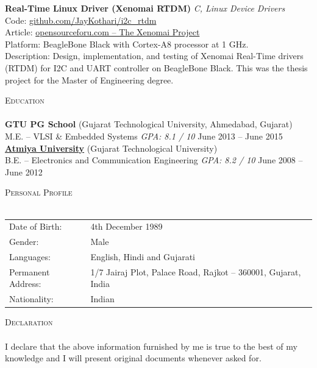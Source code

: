 \documentclass[a4paper]{article}
\newcommand{\lineunder} {
    \vspace*{-8pt} \\
    \hspace*{-18pt} \hrulefill \\
}
\newcommand{\header} [1] {
    {\hspace*{-18pt}\vspace*{6pt} \textsc{#1}}
    \vspace*{-6pt} \lineunder
}
\begin{document}
{\textbf{Real-Time Linux Driver (Xenomai RTDM)}} {\sl C, Linux Device Drivers} \\
Code: \href{https://github.com/JayKothari/i2c_rtdm}{github.com/JayKothari/i2c\_rtdm} \\
Article: \href{https://www.opensourceforu.com/2015/10/the-xenomai-project-a-linux-based-rtos/}{opensourceforu.com -- The Xenomai Project}\\
\vspace*{1mm}
Platform: BeagleBone Black with Cortex-A8 processor at 1 GHz.\\
Description: Design, implementation, and testing of Xenomai Real-Time drivers (RTDM) for I2C and UART controller on BeagleBone Black. This was the thesis project for the Master of Engineering degree.\\
\vspace*{2mm}

\header{Education}
\textbf{GTU PG School} (Gujarat Technological University, Ahmedabad, Gujarat)\\
M.E. -- VLSI \& Embedded Systems \hfill \textit{GPA: 8.1 / 10} \hfill June 2013 -- June 2015\\
\vspace{2mm}
\textbf{\href{https://atmiyauni.ac.in/}{Atmiya University}} (Gujarat Technological University)\\
B.E. -- Electronics and Communication Engineering \hfill \textit{GPA: 8.2 / 10} \hfill June 2008 -- June 2012\\
\vspace{2mm}

\header{Personal Profile}
\begin{tabular}{ l l }
	Date of Birth:     & 4th December 1989                                          \\
	Gender:            & Male                                                       \\
	Languages:         & English, Hindi and Gujarati                                \\
	Permanent Address: & 1/7 Jairaj Plot, Palace Road, Rajkot -- 360001, Gujarat, India \\
	Nationality:       & Indian                                                     \\
\end{tabular}
\vspace*{2mm}

\header{Declaration}
I declare that the above information furnished by me is true to the best of my knowledge and I will present original documents whenever asked for.
\vspace*{2mm}

\ 
\end{document}

